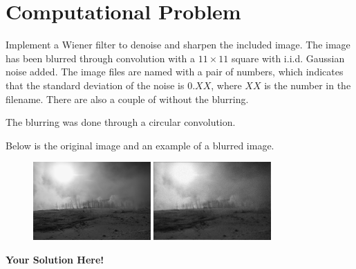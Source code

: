 \documentclass[12pt]{article}
\newcommand{\0}{\mathbf{0}}
\newcommand{\1}{\mathbf{1}}
\newcommand{\solspace}{\vspace{3mm} \textbf{Your Solution Here!} \vspace{3mm}}
\begin{document}
\pagebreak
\section{Computational Problem}

Implement a Wiener filter to denoise and sharpen the included image.
The image has been blurred through convolution with a $11 \times 11$ square with i.i.d. Gaussian noise added.
The image files are named with a pair of numbers, which indicates that the standard deviation of the noise is $0.XX$, where $XX$ is the number in the filename.
There are also a couple of without the blurring.

The blurring was done through a circular convolution.

Below is the original image and an example of a blurred image.

\begin{figure}[h]
    \centering
    \includegraphics[width=0.4\textwidth]{TestImage.png}
    \includegraphics[width=0.4\textwidth]{testNoise_05.png}
\end{figure}

\solspace
\end{document}
